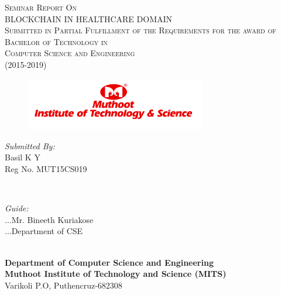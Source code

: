 \documentclass[12pt]{report}
\begin{document}
\begin{titlepage}
\center

\textsc{\large Seminar Report On}\\[1.0cm] %
\textsc{\Large BLOCKCHAIN IN HEALTHCARE DOMAIN}\\[1.0cm] %
\textsc{\large Submitted in Partial Fulfillment of the Requirements for the award of \\ Bachelor of Technology in \\ Computer Science and Engineering\\ (2015-2019)}\\[0.5cm] 

\begin{figure}[H]
\centering
\includegraphics[width=0.7\textwidth]{logo.png}\\
\end{figure}

\vspace{2.0cm}

\begin{minipage}{0.4\textwidth}
\begin{flushleft} \large
\emph{Submitted By:}\\
\hspace{0.3cm}Basil K Y\\
\hspace{0.3cm}Reg No. MUT15CS019\\
\end{flushleft}
\end{minipage}
~~~~~~~~~~~~~~~~~~~~
\begin{minipage}{0.4\textwidth}
\large
\emph{Guide:} \\
\color{white}...\color{black}Mr. Bineeth Kuriakose\\
\color{white}...\color{black}Department of CSE 
\end{minipage}\\[2cm]

\textbf{Department of Computer Science and Engineering}\\
\textbf{Muthoot Institute of Technology and Science (MITS)} \\
Varikoli P.O, Puthencruz-682308
\end{titlepage}
\end{document}

